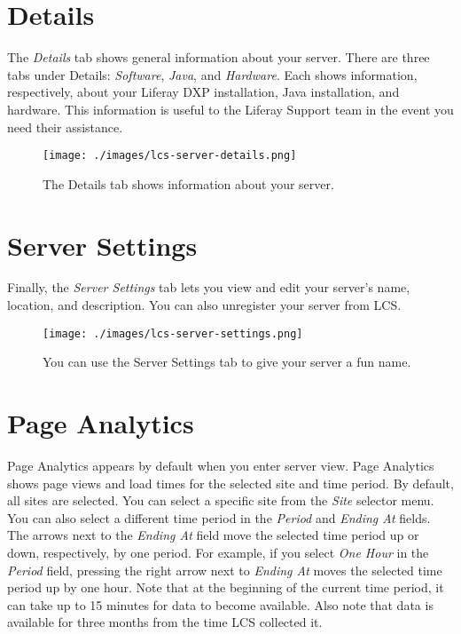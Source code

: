 \noindent\hrulefill

\section{Details}\label{details}

The \emph{Details} tab shows general information about your server.
There are three tabs under Details: \emph{Software}, \emph{Java}, and
\emph{Hardware}. Each shows information, respectively, about your
Liferay DXP installation, Java installation, and hardware. This
information is useful to the Liferay Support team in the event you need
their assistance.

\begin{figure}
\centering
\texttt{[image: ./images/lcs-server-details.png]}
\caption{The Details tab shows information about your server.}
\end{figure}

\section{Server Settings}\label{server-settings}

Finally, the \emph{Server Settings} tab lets you view and edit your
server's name, location, and description. You can also unregister your
server from LCS.

\begin{figure}
\centering
\texttt{[image: ./images/lcs-server-settings.png]}
\caption{You can use the Server Settings tab to give your server a fun
name.}
\end{figure}

\section{Page Analytics}\label{page-analytics}

Page Analytics appears by default when you enter server view. Page
Analytics shows page views and load times for the selected site and time
period. By default, all sites are selected. You can select a specific
site from the \emph{Site} selector menu. You can also select a different
time period in the \emph{Period} and \emph{Ending At} fields. The arrows
next to the \emph{Ending At} field move the selected time period up or
down, respectively, by one period. For example, if you select \emph{One
Hour} in the \emph{Period} field, pressing the right arrow next to
\emph{Ending At} moves the selected time period up by one hour. Note
that at the beginning of the current time period, it can take up to 15
minutes for data to become available. Also note that data is available
for three months from the time LCS collected it.

